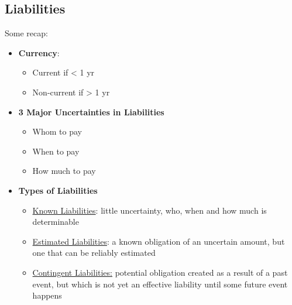 \documentclass{article}
\begin{document}
\begin{multicols}{2}
\section{Liabilities}
Some recap:
\begin{itemize}
	\item \textbf{Currency}:
	\begin{itemize}
		\item Current if < 1 yr
		\item Non-current if > 1 yr
	\end{itemize}
    \item \textbf{3 Major Uncertainties in Liabilities}
    \begin{itemize}
    	\item Whom to pay
    	\item When to pay
    	\item How much to pay
    \end{itemize}
    \item \textbf{Types of Liabilities}
    \begin{itemize}
    	\item \underline{Known Liabilities}: little uncertainty, who, when and how much is determinable
    	\item \underline{Estimated Liabilities}: a known obligation of an uncertain amount, but one that can be reliably estimated
    	\item \underline{Contingent Liabilities:} potential obligation created as a result of a past event, but which is not yet an effective liability until some future event happens
    \end{itemize}
\end{itemize}

\end{multicols}
\end{document}
